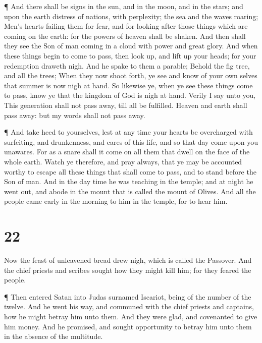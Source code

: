  ¶ And there shall be signs in the sun, and in the moon,
and in the stars; and upon the earth distress of nations, with
perplexity; the sea and the waves roaring;  Men's hearts
failing them for fear, and for looking after those things which are
coming on the earth: for the powers of heaven shall be shaken.
 And then shall they see the Son of man coming in a cloud
with power and great glory.  And when these things begin to
come to pass, then look up, and lift up your heads; for your redemption
draweth nigh.  And he spake to them a parable; Behold the
fig tree, and all the trees;  When they now shoot forth, ye
see and know of your own selves that summer is now nigh at hand.
 So likewise ye, when ye see these things come to pass,
know ye that the kingdom of God is nigh at hand.  Verily I
say unto you, This generation shall not pass away, till all be
fulfilled.  Heaven and earth shall pass away: but my words
shall not pass away.

 ¶ And take heed to yourselves, lest at any time your
hearts be overcharged with surfeiting, and drunkenness, and cares of
this life, and so that day come upon you unawares.  For as
a snare shall it come on all them that dwell on the face of the whole
earth.  Watch ye therefore, and pray always, that ye may be
accounted worthy to escape all these things that shall come to pass, and
to stand before the Son of man.  And in the day time he was
teaching in the temple; and at night he went out, and abode in the mount
that is called the mount of Olives.  And all the people
came early in the morning to him in the temple, for to hear him.

\hypertarget{section-21}{%
\section{22}\label{section-21}}

 Now the feast of unleavened bread drew nigh, which is
called the Passover.  And the chief priests and scribes
sought how they might kill him; for they feared the people.

 ¶ Then entered Satan into Judas surnamed Iscariot, being of
the number of the twelve.  And he went his way, and communed
with the chief priests and captains, how he might betray him unto them.
 And they were glad, and covenanted to give him money.
 And he promised, and sought opportunity to betray him unto
them in the absence of the multitude.

